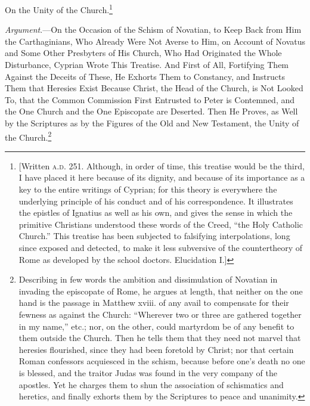 
On the Unity of the Church.\footnote{[Written \textsc{a.d.} 251. Although, in order of time, this treatise would be the third, I have placed it here because of its dignity, and because of its importance as a key to the entire writings of Cyprian; for this theory is everywhere the underlying principle of his conduct and of his correspondence. It illustrates the epistles of Ignatius as well as his own, and gives the sense in which the primitive Christians understood these words of the Creed, “the Holy Catholic Church.” This treatise has been subjected to falsifying interpolations, long since exposed and detected, to make it less subversive of the countertheory of Rome as developed by the school doctors. Elucidation I.]}

\emph{Argument}.—On the Occasion of the Schism of Novatian, to Keep Back from Him the Carthaginians, Who Already Were Not Averse to Him, on Account of Novatus and Some Other Presbyters of His Church, Who Had Originated the Whole Disturbance, Cyprian Wrote This Treatise. And First of All, Fortifying Them Against the Deceits of These, He Exhorts Them to Constancy, and Instructs Them that Heresies Exist Because Christ, the Head of the Church, is Not Looked To, that the Common Commission First Entrusted to Peter is Contemned, and the One Church and the One Episcopate are Deserted. Then He Proves, as Well by the Scriptures as by the Figures of the Old and New Testament, the Unity of the Church.\footnote{Describing in few words the ambition and dissimulation of Novatian in invading the episcopate of Rome, he argues at length, that neither on the one hand is the passage in Matthew xviii. of any avail to compensate for their fewness as against the Church: “Wherever two or three are gathered together in my name,” etc.; nor, on the other, could martyrdom be of any benefit to them outside the Church. Then he tells them that they need not marvel that heresies flourished, since they had been foretold by Christ; nor that certain Roman confessors acquiesced in the schism, because before one’s death no one is blessed, and the traitor Judas was found in the very company of the apostles. Yet he charges them to shun the association of schismatics and heretics, and finally exhorts them by the Scriptures to peace and unanimity.}

